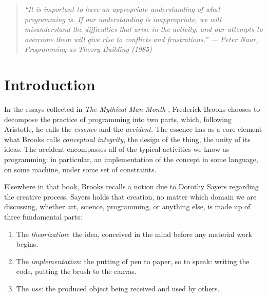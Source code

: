 \documentclass[12pt]{extarticle}
\title{\doctitle}
\author{Jeremy Jacobson}
\date{March 9, 2026}
\begin{document}
\maketitle
\thispagestyle{firstpage}

\begin{quote}
\itshape
``It is important to have an appropriate understanding of what
programming is. If our understanding is inappropriate, we will
misunderstand the difficulties that arise in the activity, and our
attempts to overcome them will give rise to conflicts and
frustrations.''
\upshape
\hfill --- Peter Naur, \emph{Programming as Theory Building} (1985)
\end{quote}

\bigskip

\begin{abstract}
While I am certain that much has been written on topics adjacent to
those discussed here, I have chosen not to review the literature beyond the references cited
herein. I am writing this because I found that, in order to use AI
effectively for coding, I needed such a thing, a theory of
programming.
\end{abstract}

\section{Introduction}

In the essays collected in \emph{The Mythical Man-Month}
\cite{brooks1995}, Frederick Brooks chooses to decompose the practice
of programming into two parts, which, following Aristotle, he calls
the \emph{essence} and the \emph{accident}. The essence has as a core
element what Brooks calls \emph{conceptual integrity}, the design of
the thing, the unity of its ideas. The accident encompasses all of
the typical activities we know as programming: in particular, an
implementation of the concept in some language, on some machine, under
some set of constraints.

Elsewhere in that book, Brooks recalls a notion due to Dorothy Sayers
\cite{sayers1941} regarding the creative process. Sayers holds that
creation, no matter which domain we are discussing, whether art,
science, programming, or anything else, is made up of three
fundamental parts:
\begin{enumerate}
  \item The \emph{theorization}: the idea, conceived in the mind
    before any material work begins.
  \item The \emph{implementation}: the putting of pen to paper, so to
    speak: writing the code, putting the brush to the canvas.
  \item The \emph{use}: the produced object being received and used by
    others.
\end{enumerate}
\end{document}
